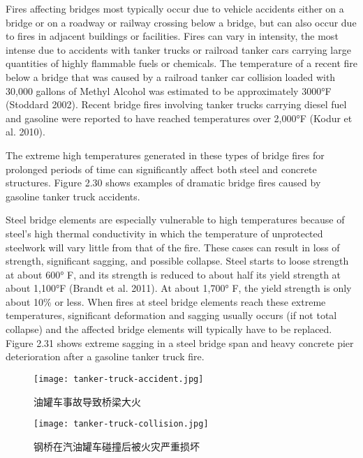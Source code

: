 Fires affecting bridges most typically occur due to vehicle accidents either on a bridge or on a roadway or
railway crossing below a bridge, but can also occur due to fires in adjacent buildings or facilities. Fires can vary in
intensity, the most intense due to accidents with tanker trucks or railroad tanker cars carrying large quantities of
highly flammable fuels or chemicals. The temperature of a recent fire below a bridge that was caused by a railroad
tanker car collision loaded with 30,000 gallons of Methyl Alcohol was estimated to be approximately 3000°F
(Stoddard 2002). Recent bridge fires involving tanker trucks carrying diesel fuel and gasoline were reported to have
reached temperatures over 2,000°F (Kodur et al. 2010).

The extreme high temperatures generated in these types of bridge fires for prolonged periods of time can
significantly affect both steel and concrete structures. Figure 2.30 shows examples of dramatic bridge fires caused by
gasoline tanker truck accidents.

Steel bridge elements are especially vulnerable to high temperatures because of steel’s high thermal conductivity
in which the temperature of unprotected steelwork will vary little from that of the fire. These cases can result in loss
of strength, significant sagging, and possible collapse. Steel starts to loose strength at about 600° F, and its strength
is reduced to about half its yield strength at about 1,100°F (Brandt et al. 2011). At about 1,700° F, the yield strength
is only about 10\% or less. When fires at steel bridge elements reach these extreme temperatures, significant
deformation and sagging usually occurs (if not total collapse) and the affected bridge elements will typically have to
be replaced. Figure 2.31 shows extreme sagging in a steel bridge span and heavy concrete pier deterioration after a
gasoline tanker truck fire.

\begin{figure}
  \texttt{[image: tanker-truck-accident.jpg]}
  \caption{油罐车事故导致桥梁大火}
  \label{fig:tanker-truck-accident}
\end{figure}
\begin{figure}
  \texttt{[image: tanker-truck-collision.jpg]}
  \caption{钢桥在汽油罐车碰撞后被火灾严重损坏}
  \label{fig:tanker-truck-collision}
\end{figure}

